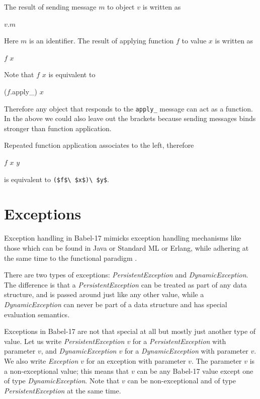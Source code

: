 \documentclass[11pt]{amsart}
\newcommand{\metababel}[1] {\textsl{#1}}
\newcommand{\babelsrc}[1] {\lstinline!#1!}
\begin{document}
The result of sending message $m$ to object $v$  is written as
\begin{babellisting}
$v$.$m$
\end{babellisting}
Here $m$ is an identifier. 
The result of applying function $f$ to value $x$ is written as 
\begin{babellisting}
$f$ $x$
\end{babellisting}
Note that $f$ $x$ is equivalent to 
\begin{babellisting}
($f$.apply_) $x$
\end{babellisting}
Therefore any object that responds to the \babelsrc{apply_} message can act as a function.
In the above we could also leave out the brackets because sending messages binds stronger than function application. 

Repeated function application associates to the left, therefore 
\begin{babellisting}
$f$ $x$ $y$ 
\end{babellisting} 
is equivalent to \babelsrc{($f$\ $x$)\ $y$}.

\section{Exceptions}
Exception handling in Babel-17 mimicks exception handling mechanisms like those which can be found in Java or Standard ML or Erlang, while adhering at the same time to the functional paradigm .

There are two types of exceptions: \metababel{PersistentException} and  \metababel{DynamicException}.
The difference is that a \metababel{PersistentException}  can be treated as part of any data structure, and is passed around just like any other value, while a \metababel{DynamicException} can never be part of a data structure and has special evaluation semantics. 

Exceptions in Babel-17 are not that special at all but mostly just another type of value.  Let us write \metababel{PersistentException $v$} for a \metababel{PersistentException} with parameter $v$,
and  \metababel{DynamicException $v$} for a \metababel{DynamicException} with parameter $v$. 
We also write \metababel{Exception $v$} for an exception with parameter $v$. The parameter $v$ is a non-exceptional value; this means that $v$ can be any Babel-17 value except one of type \metababel{DynamicException}. Note that $v$ can be non-exceptional and of type \metababel{PersistentException} at the same time.
\end{document}
